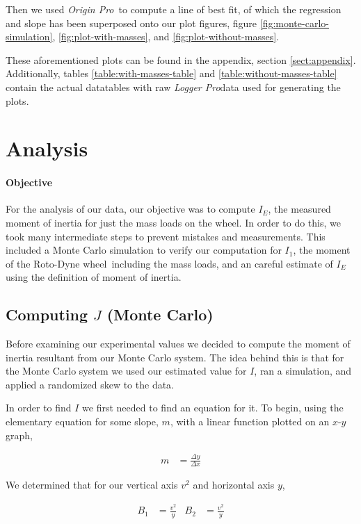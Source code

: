 \documentclass[coverpage]{article}
\newcommand{\softwareText}[1]{\textit{#1}\texttrademark}
\newcommand{\loggerpro}{\softwareText{Logger Pro}}
\newcommand{\origin}{\softwareText{Origin Pro}}
\newcommand{\rwheel}{Roto-Dyne wheel}
\begin{document}
	Then we used \origin~to compute a line of best fit, of which the regression and slope has been superposed onto our plot figures, figure \ref{fig:monte-carlo-simulation}, \ref{fig:plot-with-masses}, and \ref{fig:plot-without-masses}.
	
	These aforementioned plots can be found in the appendix, section \ref{sect:appendix}. Additionally, tables \ref{table:with-masses-table} and \ref{table:without-masses-table} contain the actual datatables with raw \loggerpro data used for generating the plots.
	
	\section{Analysis}
	
	\paragraph{Objective}
	
	For the analysis of our data, our objective was to compute $I_E$, the measured moment of inertia for just the mass loads on the wheel. In order to do this, we took many intermediate steps to prevent mistakes and measurements. This included a Monte Carlo simulation to verify our computation for $I_1$, the moment of the \rwheel~including the mass loads, and an careful estimate of $I_E$ using the definition of moment of inertia. 
	
	\subsection{Computing $J$ (Monte Carlo)}
	
	Before examining our experimental values we decided to compute the moment of inertia resultant from our Monte Carlo system. The idea behind this is that for the Monte Carlo system we used our estimated value for $I$, ran a simulation, and applied a randomized skew to the data.
	
	In order to find $I$ we first needed to find an equation for it. To begin, using the elementary equation for some slope, $m$, with a linear function plotted on an $x$-$y$ graph,
	
	\begin{align}
		m &= \frac{\Delta{y}}{\Delta{x}}
	\end{align}
	
	We determined that for our vertical axis $v^2$ and horizontal axis $y$,
	
	\begin{align}
		B_1 &= \frac{v^2}{y} &
		B_2 &= \frac{v^2}{y} \label{eq:applied-slope-equations}
	\end{align}
	
\end{document}

